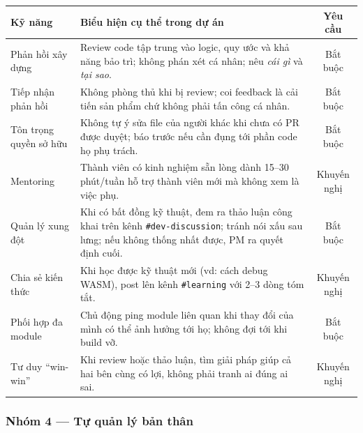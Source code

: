 \documentclass[12pt,a4paper]{article}
\begin{document}
\begin{tabularx}{\linewidth}{|l|X|c|}
\hline
\rowcolor{gray!20}
\textbf{Kỹ năng} & \textbf{Biểu hiện cụ thể trong dự án} & \textbf{Yêu cầu} \\
\hline
Phản hồi xây dựng & Review code tập trung vào logic, quy ước và khả năng bảo trì;
                    không phán xét cá nhân; nêu \textit{cái gì} và \textit{tại sao}. & Bắt buộc \\
\hline
Tiếp nhận phản hồi & Không phòng thủ khi bị review; coi feedback là cải tiến sản phẩm
                     chứ không phải tấn công cá nhân. & Bắt buộc \\
\hline
Tôn trọng quyền sở hữu & Không tự ý sửa file của người khác khi chưa có PR được duyệt;
                         báo trước nếu cần đụng tới phần code họ phụ trách. & Bắt buộc \\
\hline
Mentoring & Thành viên có kinh nghiệm sẵn lòng dành 15--30 phút/tuần hỗ trợ thành
            viên mới mà không xem là việc phụ. & Khuyến nghị \\
\hline
Quản lý xung đột & Khi có bất đồng kỹ thuật, đem ra thảo luận công khai trên kênh
                   \texttt{\#dev-discussion}; tránh nói xấu sau lưng; nếu không thống nhất
                   được, PM ra quyết định cuối. & Bắt buộc \\
\hline
Chia sẻ kiến thức & Khi học được kỹ thuật mới (vd: cách debug WASM), post lên kênh
                    \texttt{\#learning} với 2--3 dòng tóm tắt. & Khuyến nghị \\
\hline
Phối hợp đa module & Chủ động ping module liên quan khi thay đổi của mình có thể ảnh
                     hưởng tới họ; không đợi tới khi build vỡ. & Bắt buộc \\
\hline
Tư duy ``win-win'' & Khi review hoặc thảo luận, tìm giải pháp giúp cả hai bên cùng có lợi,
                     không phải tranh ai đúng ai sai. & Khuyến nghị \\
\hline
\end{tabularx}

\subsubsection{Nhóm 4 --- Tự quản lý bản thân}
\end{document}
